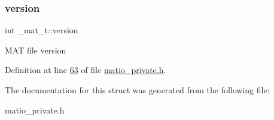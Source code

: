 \mbox{\label{struct__mat__t_a729c2bc0afc97485057a5af425635b1a}} 
\subsubsection{\texorpdfstring{version}{version}}
{\footnotesize\ttfamily int \+\_\+mat\+\_\+t\+::version}

M\+AT file version 

Definition at line \hyperlink{matio__private_8h_source_l00063}{63} of file \hyperlink{matio__private_8h_source}{matio\+\_\+private.\+h}.



The documentation for this struct was generated from the following file\+:\begin{DoxyCompactItemize}
\item 
matio\+\_\+private.\+h\end{DoxyCompactItemize}
